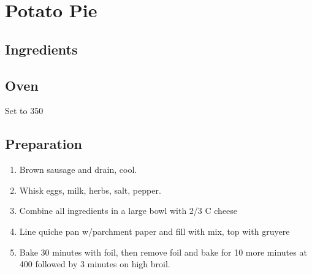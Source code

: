 \documentclass[ansiapaper,10pt,english]{sphinxmanual}
\begin{document}
\chapter{Potato Pie}
\label{\detokenize{Potato_Pie:potato-pie}}\label{\detokenize{Potato_Pie::doc}}

\section{Ingredients}
\label{\detokenize{Potato_Pie:ingredients}}
%
\begin{sphinxVerbatim}[commandchars=\\\{\}]
   

 

  

    

  

   

   

   
\end{sphinxVerbatim}


\section{Oven}
\label{\detokenize{Potato_Pie:oven}}
Set to 350


\section{Preparation}
\label{\detokenize{Potato_Pie:preparation}}\begin{enumerate}
\item {} 
Brown sausage and drain, cool.

\item {} 
Whisk eggs, milk, herbs, salt, pepper.

\item {} 
Combine all ingredients in a large bowl with 2/3 C cheese

\item {} 
Line quiche pan w/parchment paper and fill with mix, top with gruyere

\item {} 
Bake 30 minutes with foil, then remove foil and bake for 10 more minutes at 400 followed by 3 minutes on high broil.

\end{enumerate}
\end{document}
